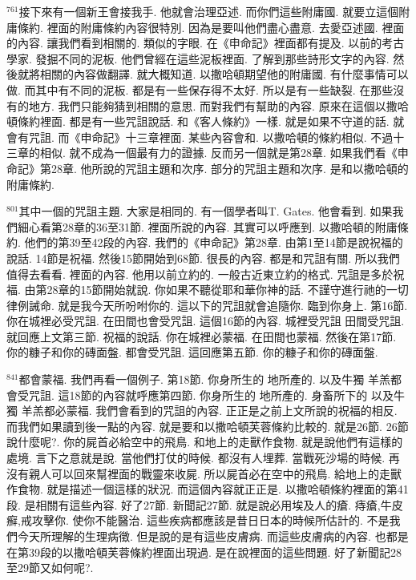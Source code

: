 \documentclass{book}
\begin{document}
$^{761}$接下來有一個新王會接我手.
他就會治理亞述.
而你們這些附庸國.
就要立這個附庸條約.
裡面的附庸條約內容很特別.
因為是要叫他們盡心盡意.
去愛亞述國.
裡面的內容.
讓我們看到相關的.
類似的字眼.
在《申命記》裡面都有提及.
以前的考古學家.
發掘不同的泥板.
他們曾經在這些泥板裡面.
了解到那些詩形文字的內容.
然後就將相關的內容做翻譯.
就大概知道.
以撒哈頓期望他的附庸國.
有什麼事情可以做.
而其中有不同的泥板.
都是有一些保存得不太好.
所以是有一些缺裂.
在那些沒有的地方.
我們只能夠猜到相關的意思.
而對我們有幫助的內容.
原來在這個以撒哈頓條約裡面.
都是有一些咒詛說話.
和《客人條約》一樣.
就是如果不守道的話.
就會有咒詛.
而《申命記》十三章裡面.
某些內容會和.
以撒哈頓的條約相似.
不過十三章的相似.
就不成為一個最有力的證據.
反而另一個就是第28章.
如果我們看《申命記》第28章.
他所說的咒詛主題和次序.
部分的咒詛主題和次序.
是和以撒哈頓的附庸條約.

$^{801}$其中一個的咒詛主題.
大家是相同的.
有一個學者叫T. Gates.
他會看到.
如果我們細心看第28章的36至31節.
裡面所說的內容.
其實可以呼應到.
以撒哈頓的附庸條約.
他們的第39至42段的內容.
我們的《申命記》第28章.
由第1至14節是說祝福的說話.
14節是祝福.
然後15節開始到68節.
很長的內容.
都是和咒詛有關.
所以我們值得去看看.
裡面的內容.
他用以前立約的.
一般古近東立約的格式.
咒詛是多於祝福.
由第28章的15節開始就說.
你如果不聽從耶和華你神的話.
不謹守進行祂的一切律例誡命.
就是我今天所吩咐你的.
這以下的咒詛就會追隨你.
臨到你身上.
第16節.
你在城裡必受咒詛.
在田間也會受咒詛.
這個16節的內容.
城裡受咒詛 田間受咒詛.
就回應上文第三節.
祝福的說話.
你在城裡必蒙福.
在田間也蒙福.
然後在第17節.
你的糠子和你的磚面盤.
都會受咒詛.
這回應第五節.
你的糠子和你的磚面盤.

$^{841}$都會蒙福.
我們再看一個例子.
第18節.
你身所生的 地所產的.
以及牛獨 羊羔都會受咒詛.
這18節的內容就呼應第四節.
你身所生的 地所產的.
身畜所下的 以及牛獨 羊羔都必蒙福.
我們會看到的咒詛的內容.
正正是之前上文所說的祝福的相反.
而我們如果讀到後一點的內容.
就是要和以撒哈頓芙蓉條約比較的.
就是26節.
26節說什麼呢?.
你的屍首必給空中的飛鳥.
和地上的走獸作食物.
就是說他們有這樣的處境.
言下之意就是說.
當他們打仗的時候.
都沒有人埋葬.
當戰死沙場的時候.
再沒有親人可以回來幫裡面的戰靈來收屍.
所以屍首必在空中的飛鳥.
給地上的走獸作食物.
就是描述一個這樣的狀況.
而這個內容就正正是.
以撒哈頓條約裡面的第41段.
是相關有這些內容.
好了27節.
新聞記27節.
就是說必用埃及人的瘡.
痔瘡,牛皮癬,戒攻擊你.
使你不能醫治.
這些疾病都應該是昔日日本的時候所估計的.
不是我們今天所理解的生理病徵.
但是說的是有這些皮膚病.
而這些皮膚病的內容.
也都是在第39段的以撒哈頓芙蓉條約裡面出現過.
是在說裡面的這些問題.
好了新聞記28至29節又如何呢?.
\end{document}
